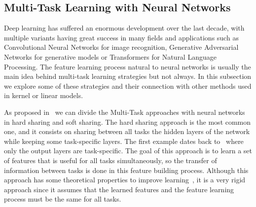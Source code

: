 


\subsection{Multi-Task Learning with Neural Networks}
Deep learning has suffered an enormous development over the last decade, with multiple variants having great success in many fields and applications such as Convolutional Neural Networks for image recognition, Generative Adversarial Networks for generative models or Transformers for Natural Language Processing. 
The feature learning process natural to neural networks is usually the main idea behind multi-task learning strategies but not always.
In this subsection we explore some of these strategies and their connection with other methods used in kernel or linear models.

As proposed in~\cite{Ruder17a} we can divide the Multi-Task approaches with neural networks in hard sharing and soft sharing.
The hard sharing approach is the most common one, and it consists on sharing between all tasks the hidden layers of the network while keeping some task-specific layers. The first example dates back to~\cite{Caruana97} where only the output layers are task-specific. The goal of this approach is to learn a set of features that is useful for all tasks simultaneously, so the transfer of information between tasks is done in this feature building process. Although this approach has some theoretical properties to improve learning~\cite{baxter2000model}, it is a very rigid approach since it assumes that the learned features and the feature learning process must be the same for all tasks.

